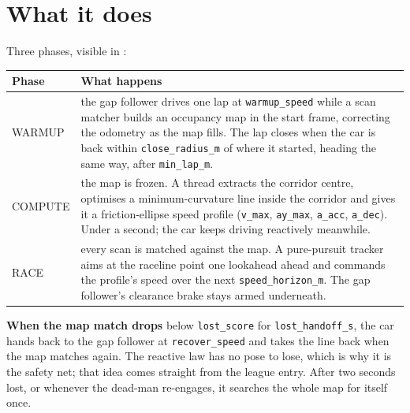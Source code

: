 \documentclass[11pt,a4paper]{article}
\begin{document}

\section{What it does}

Three phases, visible in :

\begin{tabularx}{\linewidth}{lX}
\toprule
Phase & What happens \\
\midrule
WARMUP & the gap follower drives one lap at \texttt{warmup\_speed} while a scan matcher builds an occupancy map
  in the start frame, correcting the odometry as the map fills. The lap closes when the car is back within
  \texttt{close\_radius\_m} of where it started, heading the same way, after \texttt{min\_lap\_m}. \\
COMPUTE & the map is frozen. A thread extracts the corridor centre, optimises a minimum-curvature line inside the
  corridor and gives it a friction-ellipse speed profile (\texttt{v\_max}, \texttt{ay\_max}, \texttt{a\_acc},
  \texttt{a\_dec}). Under a second; the car keeps driving reactively meanwhile. \\
RACE & every scan is matched against the map. A pure-pursuit tracker aims at the raceline point one lookahead ahead
  and commands the profile's speed over the next \texttt{speed\_horizon\_m}. The gap follower's clearance brake stays
  armed underneath. \\
\bottomrule
\end{tabularx}

\medskip
\textbf{When the map match drops} below \texttt{lost\_score} for \texttt{lost\_handoff\_s}, the car hands back to the
gap follower at \texttt{recover\_speed} and takes the line back when the map matches again. The reactive law has no
pose to lose, which is why it is the safety net; that idea comes straight from the league entry. After two seconds
lost, or whenever the dead-man re-engages, it searches the whole map for itself once.
\end{document}
